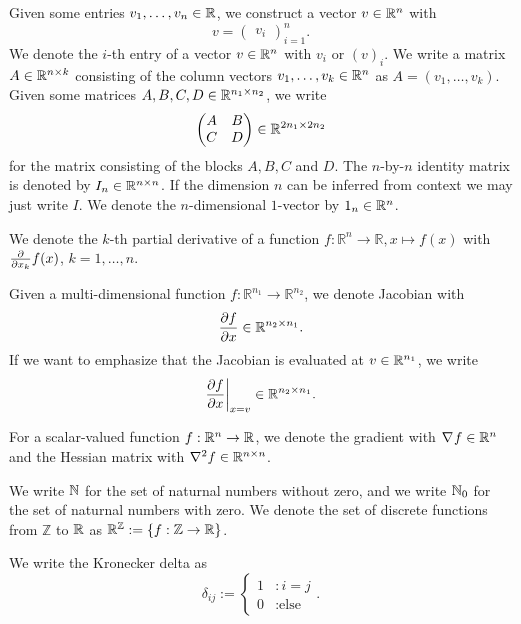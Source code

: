 \documentclass[twoside,a4paper]{article}
\begin{document}
Given some entries $v_1, \dots, v_n \in \mathbb{R}$, we construct a vector $v \in \mathbb{R}^n$ with
\begin{equation*}
	v = \begin{pmatrix}
		v_i
	\end{pmatrix}_{i=1}^n
	.
\end{equation*}
We denote the $i$-th entry of a vector $v \in \mathbb{R}^n$ with $v_i$ or $(v)_i$.
We write a matrix $A \in \mathbb{R}^{n \times k}$ consisting of the column vectors 
$v_1, \dots, v_k \in \mathbb{R}^n$ as $A = (v_1, \dots, v_k)$.
Given some matrices $A,B,C,D \in \mathbb{R}^{n_1 \times n_2}$, we write
\begin{equation*}
	\begin{pmatrix}
		A & B \\
		C & D
	\end{pmatrix} \in \mathbb{R}^{2n_1 \times 2n_2}
\end{equation*}
for the matrix consisting of the blocks $A,B,C$ and $D$.
The $n$-by-$n$ identity matrix is denoted by $I_n \in \mathbb{R}^{n \times n}$. 
If the dimension $n$ can be inferred from context we may just write $I$.
We denote the $n$-dimensional $1$-vector by $1_{n} \in \mathbb{R}^n$.

We denote the $k$-th partial derivative of a function $f: \mathbb{R}^n \to \mathbb{R},
x \mapsto f(x)$ with $\frac{\partial }{\partial x_k} f(x)$, $k=1, \dots, n$.

Given a multi-dimensional function $f: \mathbb{R}^{n_1} \to \mathbb{R}^{n_2}$,
we denote Jacobian with
\begin{equation*}
	\frac{\partial f}{\partial x} \in \mathbb{R}^{n_2 \times n_1}
	.
\end{equation*}
If we want to emphasize that the Jacobian is evaluated at $v \in \mathbb{R}^{n_1}$, we write
\begin{equation*}
	\frac{\partial f}{\partial x} \bigg|_{x = v} \in \mathbb{R}^{n_2 \times n_1}
	.
\end{equation*}

For a scalar-valued function $f : \mathbb{R}^n \to \mathbb{R}$, we denote the gradient with
$\nabla_{}{f} \in \mathbb{R}^n$ and the Hessian matrix with $\nabla^2 f \in \mathbb{R}^{n \times n}$.

We write $\mathbb{N}$ for the set of naturnal numbers without zero, and we write $\mathbb{N}_0$ 
for the set of naturnal numbers with zero. We denote the set of discrete functions from
$\mathbb{Z}$ to $\mathbb{R}$ as $\mathbb{R}^{\mathbb{Z}} := \{ f : \mathbb{Z} \to \mathbb{R} \}$.

We write the Kronecker delta as
\begin{equation*}
	\delta_{ij} := \begin{cases}
		1 &: i = j \\
		0 &: \text{else}
	\end{cases}
	.
\end{equation*}
\end{document}
